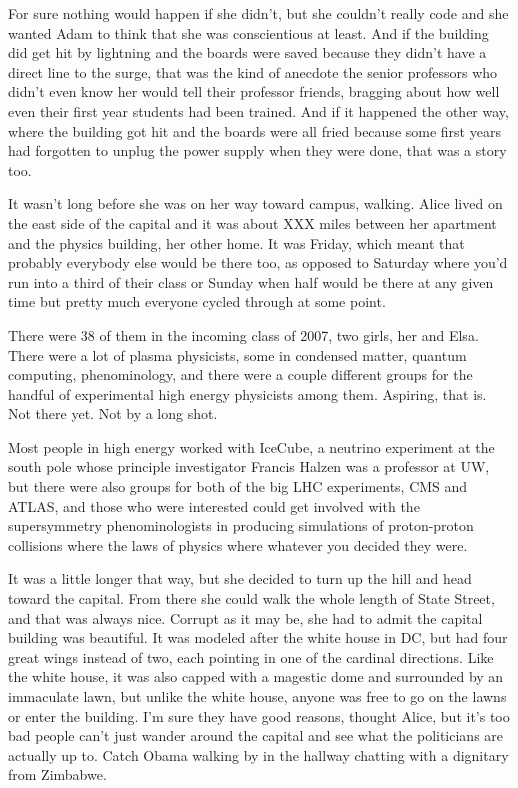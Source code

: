 For sure nothing would happen if she didn't, but she couldn't really code and she wanted Adam to think that she was conscientious at least. And if the building did get hit by lightning and the boards were saved because they didn't have a direct line to the surge, that was the kind of anecdote the senior professors who didn't even know her would tell their professor friends, bragging about how well even their first year students had been trained. And if it happened the other way, where the building got hit and the boards were all fried because some first years had forgotten to unplug the power supply when they were done, that was a story too.

\mypause

It wasn't long before she was on her way toward campus, walking. Alice lived on the east side of the capital and it was about XXX miles between her apartment and the physics building, her other home. It was Friday, which meant that probably everybody else would be there too, as opposed to Saturday where you'd run into a third of their class or Sunday when half would be there at any given time but pretty much everyone cycled through at some point. 

There were 38 of them in the incoming class of 2007, two girls, her and Elsa. There were a lot of plasma physicists, some in condensed matter, quantum computing, phenominology, and there were a couple different groups for the handful of experimental high energy physicists among them. Aspiring, that is. Not there yet. Not by a long shot. 

Most people in high energy worked with IceCube, a neutrino experiment at the south pole whose principle investigator Francis Halzen was a professor at UW, but there were also groups for both of the big LHC experiments, CMS and ATLAS, and those who were interested could get involved with the supersymmetry phenominologists in producing simulations of proton-proton collisions where the laws of physics where whatever you decided they were.

\mypause

It was a little longer that way, but she decided to turn up the hill and head toward the capital. From there she could walk the whole length of State Street, and that was always nice. Corrupt as it may be, she had to admit the capital building was beautiful. It was modeled after the white house in DC, but had four great wings instead of two, each pointing in one of the cardinal directions. Like the white house, it was also capped with a magestic dome and surrounded by an immaculate lawn, but unlike the white house, anyone was free to go on the lawns or enter the building. I'm sure they have good reasons, thought Alice, but it's too bad people can't just wander around the capital and see what the politicians are actually up to. Catch Obama walking by in the hallway chatting with a dignitary from Zimbabwe. 

